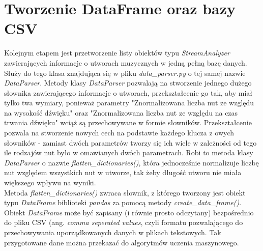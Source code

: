 \documentclass[printmode, eng, openany]{mgr}
\newcommand\tab[1][1cm]{\hspace*{#1}}
\begin{document}
\section{Tworzenie DataFrame oraz bazy CSV}
\tab Kolejnym etapem jest przetworzenie listy obiektów typu \textit{StreamAnalyzer} zawierających informacje o utworach muzycznych w jedną pełną bazę danych. Służy do tego klasa znajdująca się w pliku \textit{data\_parser.py} o tej samej nazwie \textit{DataParser}. Metody klasy \textit{DataParser} pozwalają na stworzenie jednego dużego słownika zawierającego informacje o utworach, przekształcenie go tak, aby miał tylko twa wymiary, ponieważ parametry "Znormalizowana liczba nut ze względu na wysokość dźwięku" oraz "Znormalizowana liczba nut ze względu na czas trwania dźwięku" wciąż są przechowywane w formie słowników. Przekształcenie pozwala na stworzenie nowych cech na podstawie każdego klucza z owych słowników - zamiast dwóch parametrów tworzy się ich wiele w zależności od tego ile rodzajów nut było w omawianych dwóch parametrach. Robi to metoda klasy \textit{DataParser} o nazwie \textit{flatten\_dictionaries()}, która jednocześnie normalizuje liczbę nut względem wszystkich nut w utworze, tak żeby długość utworu nie miała większego wpływu na wyniki.\\
\tab Metoda \textit{flatten\_dictionaries()} zwraca słownik, z którego tworzony jest obiekt typu \textit{DataFrame} biblioteki \textit{pandas} za pomocą metody \textit{create\_data\_frame()}. Obiekt \textit{DataFrame} może być zapisany (i równie prosto odczytany) bezpośrednio do pliku CSV (ang. \textit{comma seperated values}, czyli formatu pozwalającego do przechowywania uporządkowanych danych w plikach tekstowych. Tak przygotowane dane można przekazać do algorytmów uczenia maszynowego.
\end{document}
